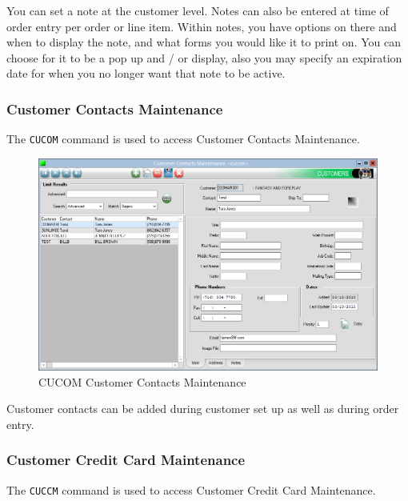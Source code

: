 You can set a note at the customer level. Notes can also be entered at time of order entry per order or line item. Within notes, you have options on there and when to display the note, and what forms you would like it to print on. You can choose for it to be a pop up and / or display, also you may specify an expiration date for when you no longer want that note to be active.

\subsubsection{Customer Contacts Maintenance}


The \texttt{CUCOM} command is used to access Customer Contacts Maintenance.

\begin{figure}[H]
	\includegraphics[width=\textwidth]{../img/image90}
	\caption{CUCOM Customer Contacts Maintenance}
\end{figure}

Customer contacts can be added during customer set up as well as during order entry.

\subsubsection{Customer Credit Card Maintenance}


The \texttt{CUCCM} command is used to access Customer Credit Card Maintenance.


